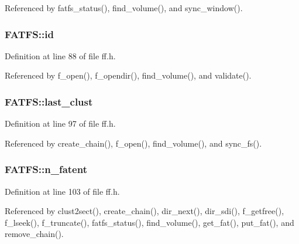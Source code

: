Referenced by fatfs\+\_\+status(), find\+\_\+volume(), and sync\+\_\+window().

\subsubsection[{\texorpdfstring{id}{id}}]{ F\+A\+T\+F\+S\+::id}\hypertarget{structFATFS_a417095d7c20d56d417dc0998e0dd5a5c}{}\label{structFATFS_a417095d7c20d56d417dc0998e0dd5a5c}


Definition at line 88 of file ff.\+h.



Referenced by f\+\_\+open(), f\+\_\+opendir(), find\+\_\+volume(), and validate().

\subsubsection[{\texorpdfstring{last\+\_\+clust}{last_clust}}]{ F\+A\+T\+F\+S\+::last\+\_\+clust}\hypertarget{structFATFS_ad315def289218e26ab78ff90fde700d1}{}\label{structFATFS_ad315def289218e26ab78ff90fde700d1}


Definition at line 97 of file ff.\+h.



Referenced by create\+\_\+chain(), f\+\_\+open(), find\+\_\+volume(), and sync\+\_\+fs().

\subsubsection[{\texorpdfstring{n\+\_\+fatent}{n_fatent}}]{ F\+A\+T\+F\+S\+::n\+\_\+fatent}\hypertarget{structFATFS_a8da50eeba6469bc20d60ca0cf9a1307c}{}\label{structFATFS_a8da50eeba6469bc20d60ca0cf9a1307c}


Definition at line 103 of file ff.\+h.



Referenced by clust2sect(), create\+\_\+chain(), dir\+\_\+next(), dir\+\_\+sdi(), f\+\_\+getfree(), f\+\_\+lseek(), f\+\_\+truncate(), fatfs\+\_\+status(), find\+\_\+volume(), get\+\_\+fat(), put\+\_\+fat(), and remove\+\_\+chain().

